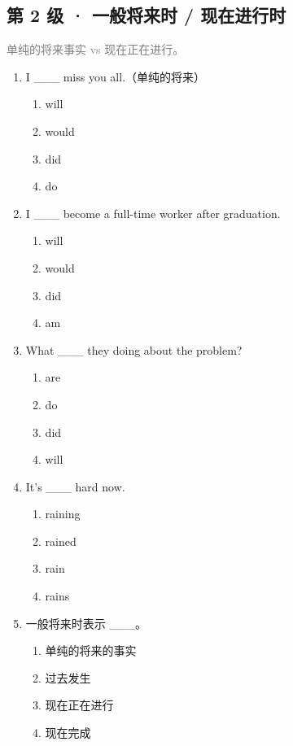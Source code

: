 \documentclass[11pt,a4paper]{ctexart}
\begin{document}
\subsection*{第 2 级 · 一般将来时 / 现在进行时}
\noindent\textcolor{gray}{单纯的将来事实 vs 现在正在进行。}\par\smallskip
\begin{enumerate}[leftmargin=*,itemsep=4pt]
\item I \_\_\_ miss you all.（单纯的将来）
\begin{enumerate}[label=\Alph*.,leftmargin=2em,itemsep=1pt,topsep=2pt]
\item will
\item would
\item did
\item do
\end{enumerate}
\item I \_\_\_ become a full-time worker after graduation.
\begin{enumerate}[label=\Alph*.,leftmargin=2em,itemsep=1pt,topsep=2pt]
\item will
\item would
\item did
\item am
\end{enumerate}
\item What \_\_\_ they doing about the problem?
\begin{enumerate}[label=\Alph*.,leftmargin=2em,itemsep=1pt,topsep=2pt]
\item are
\item do
\item did
\item will
\end{enumerate}
\item It’s \_\_\_ hard now.
\begin{enumerate}[label=\Alph*.,leftmargin=2em,itemsep=1pt,topsep=2pt]
\item raining
\item rained
\item rain
\item rains
\end{enumerate}
\item 一般将来时表示 \_\_\_。
\begin{enumerate}[label=\Alph*.,leftmargin=2em,itemsep=1pt,topsep=2pt]
\item 单纯的将来的事实
\item 过去发生
\item 现在正在进行
\item 现在完成

\end{enumerate}
\end{enumerate}
\end{document}
